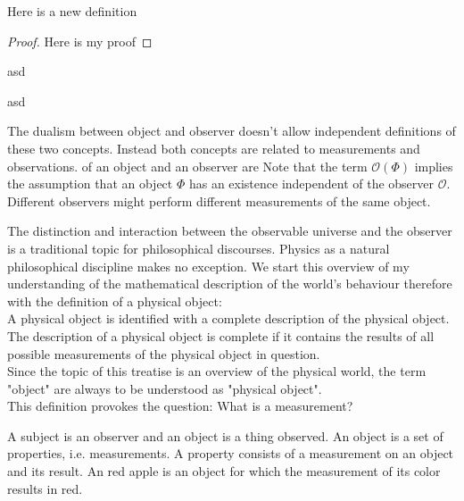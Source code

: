 \begin{theorem}
Here is a new definition
\begin{proof}
Here is my proof
\end{proof}
\begin{example}
asd
\end{example}
\begin{example}
asd
\end{example}
\end{theorem}
The dualism between object and observer doesn't allow independent definitions of these two concepts. Instead both concepts are related to measurements and observations. of an object and an observer are 
Note that the term $\mathcal{O}(\Phi)$ implies the assumption that an object $\Phi$ has an existence independent  of the observer $\mathcal{O}$. Different observers might perform different measurements of the same object.


The distinction and interaction between the observable universe and the observer is a traditional topic for philosophical discourses. Physics as a natural philosophical discipline makes no exception. We start this overview of my understanding of the mathematical description of the world's behaviour therefore with the definition of a physical object:\\
A physical object is identified with a complete description of the physical object.
The description of a physical object is complete if it contains the results of all possible measurements of the physical object in question.\\
Since the topic of this treatise is an overview of the physical world, the term "object" are always to be understood as "physical object".\\
This definition provokes the question: What is a measurement?
 

A subject is an observer and an object is a thing observed. An object is a set of properties, i.e. measurements. A property consists of a measurement on an object and its result. An red apple is an object for which the measurement of its color results in red.
